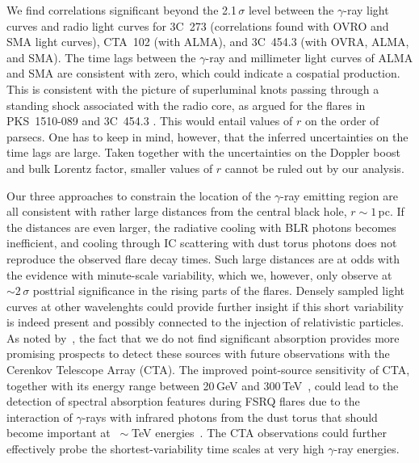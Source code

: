 \documentclass[twocolumn]{aastex62}
\newcommand{\Grays}{$\gamma$-rays\xspace}
\newcommand{\gray}{$\gamma$-ray\xspace}
\begin{document}
We find correlations significant beyond the 2.1\,$\sigma$ level between the \gray light curves and radio light curves for 3C~273 (correlations found with OVRO and SMA light curves), CTA~102 (with ALMA), and 3C~454.3 (with OVRA, ALMA, and SMA). 
The time lags between the \gray and millimeter light curves of ALMA and SMA are consistent with zero, which could indicate a cospatial production. 
This is consistent with the picture of superluminal knots passing through a standing shock associated with the radio core, as argued for the flares in PKS~1510-089 and 3C~454.3 \citep{2010ApJ...710L.126M,2012ApJ...758...72W,2013MNRAS.428.2418O}. 
This would entail values of $r$ on the order of parsecs. 
One has to keep in mind, however, that the inferred  uncertainties on the time lags are large. 
Taken together with the uncertainties on the Doppler boost and bulk Lorentz factor, 
smaller values of $r$ cannot be ruled out by our analysis. 

Our three approaches to constrain the location of the \gray emitting region are all consistent with rather large distances from the central black hole, $r \sim 1\,$pc. 
If the distances are even larger, the radiative cooling with BLR photons becomes inefficient, and cooling through IC scattering with dust torus photons does not reproduce the observed flare decay times. 
Such large distances are at odds with the evidence with minute-scale variability, which we, however, only observe at $\sim2\,\sigma$ posttrial significance in the rising parts of the flares. 
Densely sampled light curves at other wavelenghts could provide further insight if this short variability is indeed present and possibly connected to the injection of relativistic particles.
As noted by~\citet{2018MNRAS.477.4749C}, the fact that we do not find significant absorption provides more promising prospects to detect these sources with future observations with the Cerenkov Telescope Array (CTA). 
The improved point-source sensitivity of CTA, together with its energy range between 20\,GeV and 300\,TeV~\citep{2017arXiv170907997C}, could lead to the detection of spectral absorption features during FSRQ flares due to the interaction of \Grays with infrared photons from the dust torus that should become important at $~\sim$TeV energies~\citep[see, e.g., Figure 14 in][]{finke2016}.
The CTA observations could further effectively probe the shortest-variability time scales at very high \gray energies.
\end{document}
